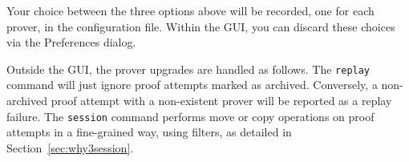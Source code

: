 Your choice between the three options above will be recorded, one for
each prover, in the \why configuration file. Within the GUI, you can
discard these choices via the \textsf{Preferences} dialog.

Outside the GUI, the prover upgrades are handled as follows. The
\texttt{replay} command will just ignore proof attempts marked as
archived.
Conversely, a non-archived proof attempt with a non-existent
prover will be reported as a replay failure. The
\texttt{session} command performs move or copy operations on
proof attempts in a fine-grained way, using filters, as detailed in
Section~\ref{sec:why3session}.




